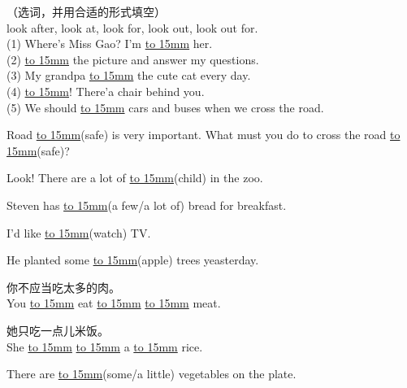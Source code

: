 \item{
    （选词，并用合适的形式填空）\\
    look after, look at, look for, look out, look out for.\\
    (1) Where's Miss Gao? I'm \underline{\hbox to 15mm{}} her. \\
    (2) \underline{\hbox to 15mm{}} the picture and answer my questions.\\
    (3) My grandpa \underline{\hbox to 15mm{}} the cute cat every day.\\
    (4) \underline{\hbox to 15mm{}}! There'a chair behind you.\\
    (5) We should \underline{\hbox to 15mm{}} cars and buses when we cross the road.
    \\
}

\item{
    Road \underline{\hbox to 15mm{}}(safe) is very important. What must you do to cross the road \underline{\hbox to 15mm{}}(safe)?
    \\
}

\item{
    Look! There are a lot of \underline{\hbox to 15mm{}}(child) in the zoo. 
    \\
}

\item{
    Steven has \underline{\hbox to 15mm{}}(a few/a lot of) bread for breakfast.
    \\
}

\item{
    I'd like \underline{\hbox to 15mm{}}(watch) TV.
    \\
}

\item{
    He planted some \underline{\hbox to 15mm{}}(apple) trees yeasterday.
    \\
}

\item{
    你不应当吃太多的肉。\\    
    You \underline{\hbox to 15mm{}} eat \underline{\hbox to 15mm{}} \underline{\hbox to 15mm{}} meat.
    \\
}

\item{
    她只吃一点儿米饭。\\    
    She \underline{\hbox to 15mm{}} \underline{\hbox to 15mm{}} a \underline{\hbox to 15mm{}} rice.
    \\
}

\item{
    There are \underline{\hbox to 15mm{}}(some/a little) vegetables on the plate.
    \\
}

